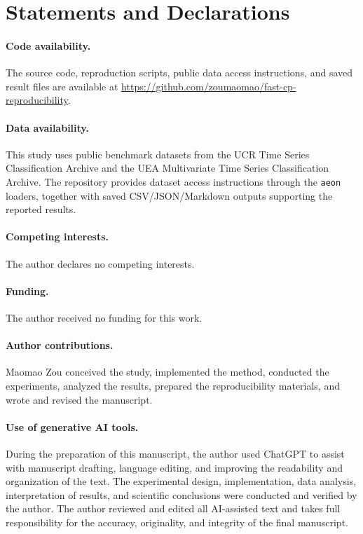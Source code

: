 \section*{Statements and Declarations}

\paragraph{Code availability.}
The source code, reproduction scripts, public data access instructions, and saved result files are available at \url{https://github.com/zoumaomao/fast-cp-reproducibility}.

\paragraph{Data availability.}
This study uses public benchmark datasets from the UCR Time Series Classification Archive and the UEA Multivariate Time Series Classification Archive. The repository provides dataset access instructions through the \texttt{aeon} loaders, together with saved CSV/JSON/Markdown outputs supporting the reported results.

\paragraph{Competing interests.}
The author declares no competing interests.

\paragraph{Funding.}
The author received no funding for this work.

\paragraph{Author contributions.}
Maomao Zou conceived the study, implemented the method, conducted the experiments, analyzed the results, prepared the reproducibility materials, and wrote and revised the manuscript.

\paragraph{Use of generative AI tools.}
During the preparation of this manuscript, the author used ChatGPT to assist with manuscript drafting, language editing, and improving the readability and organization of the text. The experimental design, implementation, data analysis, interpretation of results, and scientific conclusions were conducted and verified by the author. The author reviewed and edited all AI-assisted text and takes full responsibility for the accuracy, originality, and integrity of the final manuscript.
